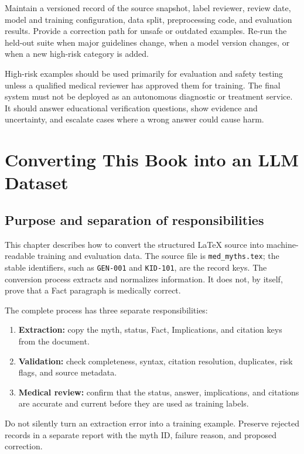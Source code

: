 \documentclass[11pt,oneside]{book}
\begin{document}
Maintain a versioned record of the source snapshot, label reviewer, review date, model and training configuration, data split, preprocessing code, and evaluation results. Provide a correction path for unsafe or outdated examples. Re-run the held-out suite when major guidelines change, when a model version changes, or when a new high-risk category is added.

High-risk examples should be used primarily for evaluation and safety testing unless a qualified medical reviewer has approved them for training. The final system must not be deployed as an autonomous diagnostic or treatment service. It should answer educational verification questions, show evidence and uncertainty, and escalate cases where a wrong answer could cause harm.

\chapter{Converting This Book into an LLM Dataset}

\section{Purpose and separation of responsibilities}

This chapter describes how to convert the structured LaTeX source into machine-readable training and evaluation data. The source file is \texttt{med\_myths.tex}; the stable identifiers, such as \texttt{GEN-001} and \texttt{KID-101}, are the record keys. The conversion process extracts and normalizes information. It does not, by itself, prove that a Fact paragraph is medically correct.

The complete process has three separate responsibilities:

\begin{enumerate}
\item \textbf{Extraction:} copy the myth, status, Fact, Implications, and citation keys from the document.
\item \textbf{Validation:} check completeness, syntax, citation resolution, duplicates, risk flags, and source metadata.
\item \textbf{Medical review:} confirm that the status, answer, implications, and citations are accurate and current before they are used as training labels.
\end{enumerate}

Do not silently turn an extraction error into a training example. Preserve rejected records in a separate report with the myth ID, failure reason, and proposed correction.
\end{document}
